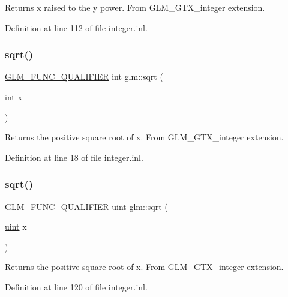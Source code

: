 Returns x raised to the y power. From G\+L\+M\+\_\+\+G\+T\+X\+\_\+integer extension. 

Definition at line 112 of file integer.\+inl.

\mbox{\label{group__gtx__integer_ga78e2e68330e91d350fcfc2f4831cad12}} 
\subsubsection{\texorpdfstring{sqrt()}{sqrt()}\hspace{0.1cm}{\footnotesize\ttfamily [1/2]}}
{\footnotesize\ttfamily \mbox{\hyperlink{setup_8hpp_a33fdea6f91c5f834105f7415e2a64407}{G\+L\+M\+\_\+\+F\+U\+N\+C\+\_\+\+Q\+U\+A\+L\+I\+F\+I\+ER}} int glm\+::sqrt (\begin{DoxyParamCaption}\item[{int}]{x }\end{DoxyParamCaption})}

Returns the positive square root of x. From G\+L\+M\+\_\+\+G\+T\+X\+\_\+integer extension. 

Definition at line 18 of file integer.\+inl.

\mbox{\label{group__gtx__integer_ga457e9efca8339bf918d319e9c55f7c8f}} 
\subsubsection{\texorpdfstring{sqrt()}{sqrt()}\hspace{0.1cm}{\footnotesize\ttfamily [2/2]}}
{\footnotesize\ttfamily \mbox{\hyperlink{setup_8hpp_a33fdea6f91c5f834105f7415e2a64407}{G\+L\+M\+\_\+\+F\+U\+N\+C\+\_\+\+Q\+U\+A\+L\+I\+F\+I\+ER}} \mbox{\hyperlink{group__core__precision_ga4fd29415871152bfb5abd588334147c8}{uint}} glm\+::sqrt (\begin{DoxyParamCaption}\item[{\mbox{\hyperlink{group__core__precision_ga4fd29415871152bfb5abd588334147c8}{uint}}}]{x }\end{DoxyParamCaption})}

Returns the positive square root of x. From G\+L\+M\+\_\+\+G\+T\+X\+\_\+integer extension. 

Definition at line 120 of file integer.\+inl.

